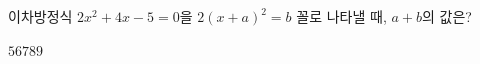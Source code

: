 이차방정식 $2x^2+4x-5=0$을 $2(x+a)^2=b$ 꼴로 나타낼 때, $a+b$의 값은? 
\begin{choices32}{$5$}{$6$}{$7$}{$8$}{$9$}\end{choices32}
